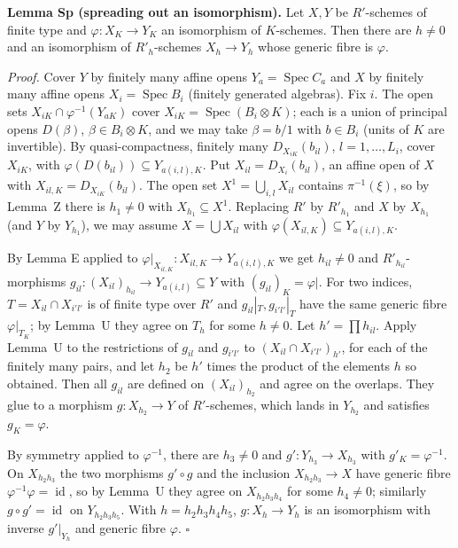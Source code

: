 \documentclass[11pt]{article}
\begin{document}
\textbf{Lemma Sp (spreading out an isomorphism).} Let $X,Y$ be $R'$-schemes of finite type and $\varphi:X_K\to Y_K$ an isomorphism of $K$-schemes. Then there are $h\neq0$ and an isomorphism of $R'_h$-schemes $X_h\to Y_h$ whose generic fibre is $\varphi$.

\emph{Proof.} Cover $Y$ by finitely many affine opens $Y_a=\operatorname{Spec}C_a$ and $X$ by finitely many affine opens $X_i=\operatorname{Spec}B_i$ (finitely generated algebras). Fix $i$. The open sets $X_{iK}\cap\varphi^{-1}(Y_{aK})$ cover $X_{iK}=\operatorname{Spec}(B_i\otimes K)$; each is a union of principal opens $D(\beta)$, $\beta\in B_i\otimes K$, and we may take $\beta=b/1$ with $b\in B_i$ (units of $K$ are invertible). By quasi-compactness, finitely many $D_{X_{iK}}(b_{il})$, $l=1,\dots,L_i$, cover $X_{iK}$, with $\varphi(D(b_{il}))\subseteq Y_{a(i,l),K}$. Put $X_{il}=D_{X_i}(b_{il})$, an affine open of $X$ with $X_{il,K}=D_{X_{iK}}(b_{il})$. The open set $X^1=\bigcup_{i,l}X_{il}$ contains $\pi^{-1}(\xi)$, so by Lemma~Z there is $h_1\neq0$ with $X_{h_1}\subseteq X^1$. Replacing $R'$ by $R'_{h_1}$ and $X$ by $X_{h_1}$ (and $Y$ by $Y_{h_1}$), we may assume $X=\bigcup X_{il}$ with $\varphi(X_{il,K})\subseteq Y_{a(i,l),K}$.

By Lemma E applied to $\varphi|_{X_{il,K}}:X_{il,K}\to Y_{a(i,l),K}$ we get $h_{il}\neq0$ and $R'_{h_{il}}$-morphisms $g_{il}:(X_{il})_{h_{il}}\to Y_{a(i,l)}\subseteq Y$ with $(g_{il})_K=\varphi|$. For two indices, $T=X_{il}\cap X_{i'l'}$ is of finite type over $R'$ and $g_{il}|_T,g_{i'l'}|_T$ have the same generic fibre $\varphi|_{T_K}$; by Lemma~U they agree on $T_{h}$ for some $h\neq0$. Let $h'=\prod h_{il}$. Apply Lemma~U to the restrictions of $g_{il}$ and $g_{i'l'}$ to $(X_{il}\cap X_{i'l'})_{h'}$, for each of the finitely many pairs, and let $h_2$ be $h'$ times the product of the elements $h$ so obtained. Then all $g_{il}$ are defined on $(X_{il})_{h_2}$ and agree on the overlaps. They glue to a morphism $g:X_{h_2}\to Y$ of $R'$-schemes, which lands in $Y_{h_2}$ and satisfies $g_K=\varphi$.

By symmetry applied to $\varphi^{-1}$, there are $h_3\neq0$ and $g':Y_{h_3}\to X_{h_3}$ with $g'_K=\varphi^{-1}$. On $X_{h_2h_3}$ the two morphisms $g'\circ g$ and the inclusion $X_{h_2h_3}\to X$ have generic fibre $\varphi^{-1}\varphi=\operatorname{id}$, so by Lemma~U they agree on $X_{h_2h_3h_4}$ for some $h_4\neq0$; similarly $g\circ g'=\operatorname{id}$ on $Y_{h_2h_3h_5}$. With $h=h_2h_3h_4h_5$, $g:X_h\to Y_h$ is an isomorphism with inverse $g'|_{Y_h}$ and generic fibre $\varphi$. $\square$
\end{document}
